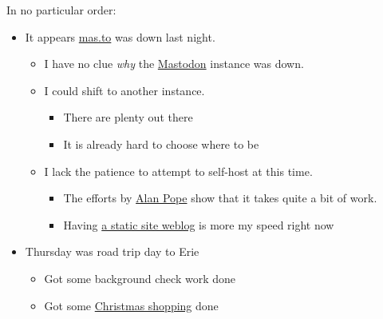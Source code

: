 In no particular order:

\begin{itemize}
\tightlist
\item
  It appears \href{https://mas.to}{mas.to} was down last night.

  \begin{itemize}
  \tightlist
  \item
    I have no clue \emph{why} the
    \href{https://popey.com/blog/2022/11/find-your-twitter-friends-on-mastodon/}{Mastodon}
    instance was down.
  \item
    I could shift to another instance.

    \begin{itemize}
    \tightlist
    \item
      There are plenty out there
    \item
      It is already hard to choose where to be
    \end{itemize}
  \item
    I lack the patience to attempt to self-host at this time.

    \begin{itemize}
    \tightlist
    \item
      The efforts by \href{https://mastodon.social/@popey}{Alan Pope}
      show that it takes quite a bit of work.
    \item
      Having
      \href{https://en.wikipedia.org/w/index.php?title=Static_site_generator&oldid=1125711762}{a
      static site weblog} is more my speed right now
    \end{itemize}
  \end{itemize}
\item
  Thursday was road trip day to Erie

  \begin{itemize}
  \tightlist
  \item
    Got some background check work done
  \item
    Got some
    \href{https://stores.barnesandnoble.com/store/2572}{Christmas
    shopping} done


\end{itemize}
\end{itemize}
